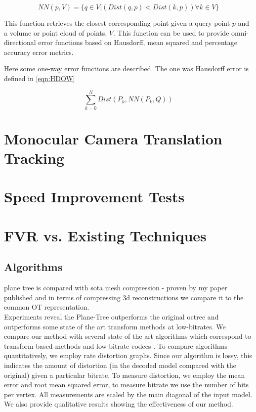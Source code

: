 \begin{equation} \label{eqn:NN}
NN(p, V) =  \{ q \in V | (Dist(q, p) < Dist(k, p))  \forall k \in V \}
\end{equation}

This function retrieves the closest corresponding point given a query point $p$ and a volume or point cloud of points, $V$. This function can be used to provide omni-directional error functions based on Hausdorff, mean squared and percentage accuracy error metrics.

Here some one-way error functions are described. The one was Hausdorff error is defined in \ref{eqn:HDOW} 

\begin{equation} \label{eqn:HDOW}
\sum_{k=0}^{N} Dist(P_k, NN(P_k, Q))
\end{equation}




\section{Monocular Camera Translation Tracking}
\section{Speed Improvement Tests}


\section{FVR vs. Existing Techniques}
\subsection{Algorithms} \label{AlgorithmsSection} 




plane tree is compared with sota mesh compression - proven by my paper published and in terms of compressing 3d reconstructions we compare it to the common OT representation. \\

Experiments reveal the Plane-Tree outperforms the original octree and outperforms some state of the art transform methods at low-bitrates. We compare our method with several state of the art algorithms which correspond to transform based methods \cite{Khodakovsky00Progressive,Bayazit103DMesh} and low-bitrate codecs \cite{Peng10Feature}. To compare algorithms quantitatively, we employ rate distortion graphs. Since our algorithm is lossy, this indicates the amount of distortion (in the decoded model compared with the original) given a particular bitrate. To measure distortion, we employ the mean error and root mean squared error, to measure bitrate we use the number of bits per vertex. All measurements are scaled by the main diagonal of the input model. We also provide qualitative results showing the effectiveness of our method. \\

